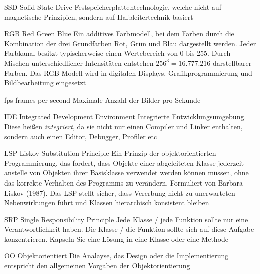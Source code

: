   {SSD}            %
  {Solid-State-Drive}  %
  {Festspeicherplattentechnologie, welche nicht auf magnetische Prinzipien, sondern auf Halbleitertechnik basiert} %

  {RGB}            %
  {Red Green Blue}  %
  {Ein additives Farbmodell, bei dem Farben durch die Kombination 	der drei Grundfarben Rot, Grün und Blau  dargestellt werden. Jeder Farbkanal besitzt typischerweise einen Wertebereich von 0 bis 255. Durch Mischen unterschiedlicher Intensitäten entstehen $256^3 = 16.777.216$ darstellbarer Farben. Das RGB-Modell wird in digitalen Displays, Grafikprogrammierung und Bildbearbeitung eingesetzt} %

  {fps}            %
  {frames per second}  %
  {Maximale Anzahl der Bilder pro Sekunde} %

  {IDE}            %
  {Integrated Development Environment}  %
  {Integrierte Entwicklungsumgebung. Diese heißen \emph{integriert}, da sie nicht nur einen Compiler und Linker enthalten, sondern auch einen Editor, Debugger, Profiler etc} %

  {LSP}            %
  {Liskov Substitution Principle}  %
  {Ein Prinzip der objektorientierten Programmierung, das fordert, dass Objekte einer abgeleiteten Klasse
  	jederzeit anstelle von Objekten ihrer Basisklasse verwendet werden können müssen, ohne das korrekte Verhalten des Programms zu verändern. Formuliert von Barbara Liskov (1987). Das LSP stellt sicher, dass Vererbung nicht zu unerwarteten Nebenwirkungen führt und Klassen hierarchisch konsistent bleiben} %

{SRP}            %
{Single Responsibility Principle}  %
{Jede Klasse / jede Funktion sollte nur eine Verantwortlichkeit haben. Die Klasse / die Funktion sollte sich auf diese Aufgabe konzentrieren. Kapseln Sie eine Lösung in eine Klasse oder eine Methode} %

  {OO}            %
  {Objektorientiert}  %
  {Die Analayse, das Design oder die Implementierung entspricht den allgemeinen Vorgaben der Objektorientierung} %

